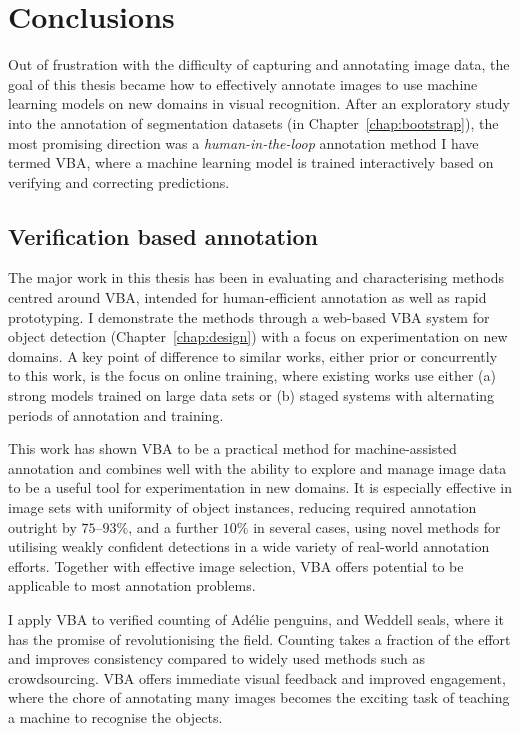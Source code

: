 \chapter{Conclusions}
\label{chap:conclusion} 

\glsresetall

Out of frustration with the difficulty of capturing and annotating image data, the goal of this thesis became how to effectively annotate images to use machine learning models on new domains in visual recognition. After an exploratory study into the annotation of segmentation datasets (in Chapter~\ref{chap:bootstrap}), the most promising direction was a \emph{human-in-the-loop} annotation method I have termed \gls{VBA}, where a machine learning model is trained interactively based on verifying and correcting predictions. 

\section{Verification based annotation}

The major work in this thesis has been in evaluating and characterising methods centred around \gls{VBA}, intended for human-efficient annotation as well as rapid prototyping. I demonstrate the methods through a web-based \gls{VBA} system for object detection (Chapter~\ref{chap:design}) with a focus on experimentation on new domains. A key point of difference to similar works, either prior or concurrently to this work, is the focus on online training, where existing works use either (a) strong models trained on large data sets or (b) staged systems with alternating periods of annotation and training. 

This work has shown \gls{VBA} to be a practical method for machine-assisted annotation and combines well with the ability to explore and manage image data to be a useful tool for experimentation in new domains. It is especially effective in image sets with uniformity of object instances, reducing required annotation outright by $75$--$93\%$, and a further $10\%$ in several cases, using novel methods for utilising weakly confident detections in a wide variety of real-world annotation efforts. Together with effective image selection, \gls{VBA} offers potential to be applicable to most annotation problems.

I apply \gls{VBA} to verified counting of Ad\'elie penguins, and Weddell seals, where it has the promise of revolutionising the field. Counting takes a fraction of the effort and improves consistency compared to widely used methods such as crowdsourcing. \gls{VBA} offers immediate visual feedback and improved engagement, where the chore of annotating many images becomes the exciting task of teaching a machine to recognise the objects.

